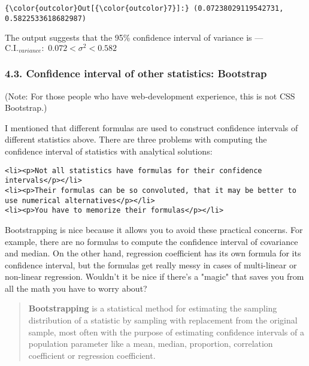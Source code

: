 \documentclass[11pt]{article}
\begin{document}
\begin{Verbatim}[commandchars=\\\{\}]
{\color{outcolor}Out[{\color{outcolor}7}]:} (0.07238029119542731, 0.5822533618682987)
\end{Verbatim}
            
    The output suggests that the 95\% confidence interval of variance is ---
{\(\text{C.I.}_{variance}: \,\, 0.072 < \sigma^2 < 0.582\)}

    \hypertarget{conf_int_of_other}{}

\subsubsection{4.3. Confidence interval of other statistics:
Bootstrap}\label{confidence-interval-of-other-statistics-bootstrap}

(Note: For those people who have web-development experience, this is not
CSS Bootstrap.)

I mentioned that different formulas are used to construct confidence
intervals of different statistics above. There are three problems with
computing the confidence interval of statistics with analytical
solutions:

\begin{verbatim}
<li><p>Not all statistics have formulas for their confidence intervals</p></li>
<li><p>Their formulas can be so convoluted, that it may be better to use numerical alternatives</p></li>
<li><p>You have to memorize their formulas</p></li>
\end{verbatim}

Bootstrapping is nice because it allows you to avoid these practical
concerns. For example, there are no formulas to compute the confidence
interval of covariance and median. On the other hand, regression
coefficient has its own formula for its confidence interval, but the
formulas get really messy in cases of multi-linear or non-linear
regression. Wouldn't it be nice if there's a "magic" that saves you from
all the math you have to worry about?

\begin{quote}
\textbf{Bootstrapping} is a statistical method for estimating the
sampling distribution of a statistic by sampling with replacement from
the original sample, most often with the purpose of estimating
confidence intervals of a population parameter like a mean, median,
proportion, correlation coefficient or regression coefficient.
\end{quote}
\end{document}
